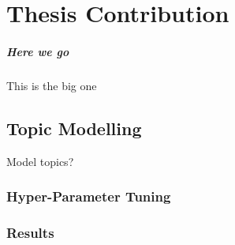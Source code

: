 \chapter{Thesis Contribution}\label{ch:ThesisCont}
   
\paragraph{Here we go} This is the big one
   
\section{Topic Modelling}\label{sec:TopicModelling}

Model topics?

\subsection{Hyper-Parameter Tuning}\label{sec:TopicModellingHP}

\subsection{Results}\label{sec:TopicModellingRes}





